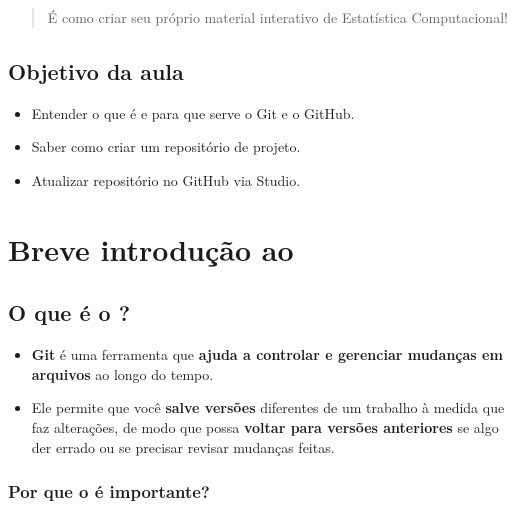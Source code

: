 \documentclass[
  letterpaper,
  DIV=11,
  numbers=noendperiod]{scrartcl}
\providecommand{\tightlist}{%
  \setlength{\itemsep}{0pt}\setlength{\parskip}{0pt}}
\begin{document}
\begin{quote}
É como criar seu próprio material interativo de Estatística
Computacional!
\end{quote}

\subsection{Objetivo da aula}\label{objetivo-da-aula}

\begin{itemize}
\tightlist
\item
  Entender o que é e para que serve o Git e o GitHub.
\item
  Saber como criar um repositório de projeto.
\item
  Atualizar repositório no GitHub via Studio.
\end{itemize}

\section{\texorpdfstring{Breve introdução ao
}{Breve introdução ao }}\label{breve-introduuxe7uxe3o-ao}

\subsection{O que é o ?}\label{o-que-uxe9-o}

\begin{itemize}
\item
  \textbf{Git} é uma ferramenta que \textbf{ajuda a controlar e
  gerenciar mudanças em arquivos} ao longo do tempo.
\item
  Ele permite que você \textbf{salve versões} diferentes de um trabalho
  à medida que faz alterações, de modo que possa \textbf{voltar para
  versões anteriores} se algo der errado ou se precisar revisar mudanças
  feitas.
\end{itemize}

\subsubsection{\texorpdfstring{Por que o é
importante?}{Por que o  é importante?}}\label{por-que-o-uxe9-importante}
\end{document}
